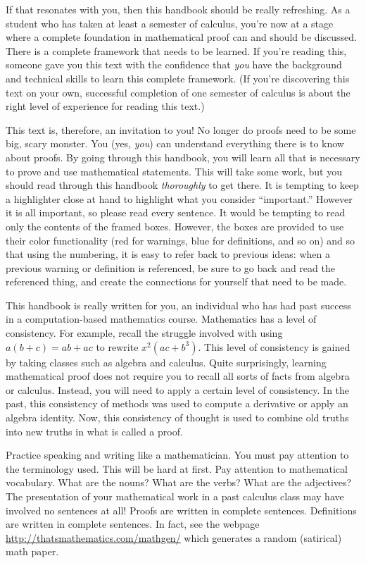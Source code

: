 \documentclass{book}
\theoremstyle{ekimcustom}
\begin{document}
If that resonates with you, then this handbook should be really refreshing. As a student who has taken at least a semester of calculus, you're now at a stage where a complete foundation in mathematical proof can and should be discussed. There is a complete framework that needs to be learned. If you're reading this, someone gave you this text with the confidence that \emph{you} have the background and technical skills to learn this complete framework. (If you're discovering this text on your own, successful completion of one semester of calculus is about the right level of experience for reading this text.)

This text is, therefore, an invitation to you! No longer do proofs need to be some big, scary monster. You (yes, \emph{you}) can understand everything there is to know about proofs. By going through this handbook, you will learn all that is necessary to prove and use mathematical statements. This will take some work, but you should read through this handbook \emph{thoroughly} to get there. It is tempting to keep a highlighter close at hand to highlight what you consider ``important.'' However it is all important, so please read every sentence. It would be tempting to read only the contents of the framed boxes. However, the boxes are provided to use their color functionality (red for warnings, blue for definitions, and so on) and so that using the numbering, it is easy to refer back to previous ideas: when a previous warning or definition is referenced, be sure to go back and read the referenced thing, and create the connections for yourself that need to be made.

This handbook is really written for you, an individual who has had past success in a computation-based mathematics course.
Mathematics has a level of consistency. For example, recall the struggle involved with using $a(b+c)=ab+ac$ to rewrite $x^2(ac+b^3)$.
This level of consistency is gained by taking classes such as algebra and calculus.
Quite surprisingly, learning mathematical proof does not require you to recall all sorts of facts from algebra or calculus.
Instead, you will need to apply a certain level of consistency.
In the past, this consistency of methods was used to compute a derivative or apply an algebra identity. Now, this consistency of thought is used to combine old truths into new truths in what is called a proof.

Practice speaking and writing like a mathematician. You must pay attention to the terminology used. This will be hard at first. Pay attention to mathematical vocabulary. What are the nouns? What are the verbs? What are the adjectives? The presentation of your mathematical work in a past calculus class may have involved no sentences at all! Proofs are written in complete sentences. Definitions are written in complete sentences. In fact, see the webpage \url{http://thatsmathematics.com/mathgen/} which generates a random (satirical) math paper.
\end{document}
